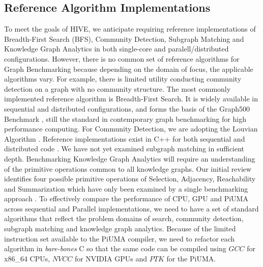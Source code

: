 \documentclass[letterpaper, 10pt]{article}
\begin{document}
\begin{multicols}{2}
        \subsection{Reference Algorithm Implementations}
        \par{To meet the goals of HIVE, we anticipate requiring reference implementations of Breadth-First Search (BFS), Community Detection, Subgraph Matching and Knowledge Graph Analytics in both single-core and paralell/distributed configurations.
        However, there is no common set of reference algorithms for Graph Benchmarking because depending on the domain of focus, the applicable algorithms vary. 
        For example, there is limited utility conducting community detection on a graph with no community structure.
        The most commonly implemented reference algorithm is Breadth-First Search. 
        It is widely available in sequential and distributed configurations, and forms the basis of the Graph500 Benchmark \cite{Murphy2010}, still the standard in contemporary graph benchmarking for high performance computing.
        For Community Detection, we are adopting the Louvian Algorithm \cite{Blondel2008}. Reference implementations exist in C++ for both sequential and distributed code \cite{Ghosh2018}. 
        We have not yet examined subgraph matching in sufficient depth.
        Benchmarking Knowledge Graph Analytics will require an understanding of the primitive operations common to all knowledge graphs. 
        Our initial review identifies four possible primitive operations of Selection, Adjacency, Reachability and Summarization which have only been examined by a single benchmarking approach \cite{Angles2013}. 
        To effectively compare the performance of CPU, GPU and PiUMA across sequential and Parallel implementations, we need to have a set of standard algorithms that reflect the problem domains of search, community detection, subgraph matching and knowledge graph analytics. 
        Because of the limited instruction set available to the PiUMA compiler, we need to refactor each algorithm in \textit{bare-bones} C so that the same code can be compiled using $GCC$ for x86\_64 CPUs, $NVCC$ for NVIDIA GPUs and $PTK$ for the PiUMA}.
        

\end{multicols}
\end{document}
